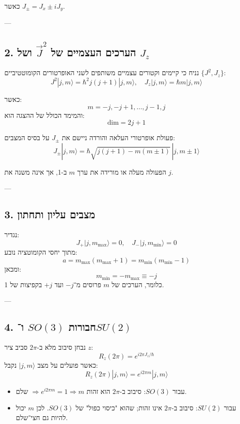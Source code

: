 כאשר \( J_{\pm} = J_x \pm i J_y \).

---

\subsection*{2. הערכים העצמיים של $\vec{J}^2$ ושל $J_z$}

נניח כי קיימים וקטורים עצמיים משותפים לשני האופרטורים הקומוטטיביים $\{J^2, J_z\}$:
\[
J^2 |j, m\rangle = \hbar^2 j(j+1) |j, m\rangle, \quad J_z |j, m\rangle = \hbar m |j, m\rangle
\]

כאשר:
\[
m = -j, -j+1, \ldots, j-1, j
\]
והמימד הכולל של ההצגה הוא:
\[
\text{dim} = 2j + 1
\]

\begin{examplebox}{פעולת אופרטורי העלאה והורדה}
ניישם את $J_\pm$ על בסיס המצבים:
\[
J_{\pm}|j,m\rangle = \hbar \sqrt{j(j+1) - m(m\pm1)}\, |j, m\pm1\rangle
\]

הפעולה מעלה או מורידה את ערך $m$ ב-1, אך אינה משנה את $j$.
\end{examplebox}

---

\subsection*{3. מצבים עליון ותחתון}

נגדיר:
\[
J_+ |j, m_{\text{max}}\rangle = 0, \quad J_- |j, m_{\text{min}}\rangle = 0
\]
מתוך יחסי הקומוטציה נובע:
\[
a = m_{\text{max}}(m_{\text{max}} + 1) = m_{\text{min}}(m_{\text{min}} - 1)
\]
ומכאן:
\[
m_{\text{min}} = -m_{\text{max}} \equiv -j
\]
כלומר, הערכים של $m$ פרוסים מ־$-j$ ועד $+j$ בקפיצות של 1.

---

\subsection*{4. חבורות $SO(3)$ ו־$SU(2)$}

נבחן סיבוב מלא ב-$2\pi$ סביב ציר $z$:
\[
R_z(2\pi) = e^{i 2\pi J_z / \hbar}
\]
כאשר פועלים על מצב $|j,m\rangle$ נקבל:
\[
R_z(2\pi)|j,m\rangle = e^{i 2\pi m}|j,m\rangle
\]

\begin{itemize}
    \item עבור \textbf{$SO(3)$}: סיבוב ב-$2\pi$ הוא זהות $\Rightarrow e^{i2\pi m}=1 \Rightarrow m$ שלם.
    \item עבור \textbf{$SU(2)$}: סיבוב ב-$2\pi$ אינו זהות; שהוא "כיסוי כפול" של $SO(3)$. לכן $m$ יכול להיות גם חצי־שלם.
\end{itemize}

